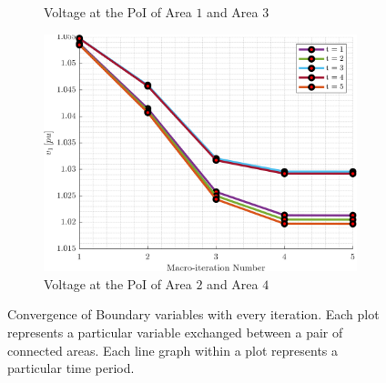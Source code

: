 \documentclass[../../outputs/main.tex]{subfiles}
\begin{document}
\begin{figure}[h!]
\begin{subfigure}[b]{0.3\textwidth}
        \caption{\scriptsize Voltage at the PoI of Area $1$ and Area $3$}
        \label{fig:voltage_1_3}
    \end{subfigure}
    \hfill
    \begin{subfigure}[b]{0.3\textwidth}
        \centering
        \includegraphics[width=\textwidth]{../figures/T5-pv20-batt30-genCost/dopf/convergenceCurves/BoundaryVoltage_vs_t_vs_macroItr_T_5_Areas_2_4_genCost_pv_20_batt_30_crop.png}
        \caption{\scriptsize Voltage at the PoI of Area $2$ and Area $4$}
        \label{fig:voltage_2_4}
    \end{subfigure}

    \caption{Convergence of Boundary variables with every iteration. Each plot represents a particular variable exchanged between a pair of connected areas. Each line graph within a plot represents a particular time period.}
    \label{fig:boundary_variables_all}
\end{figure}
\end{document}
